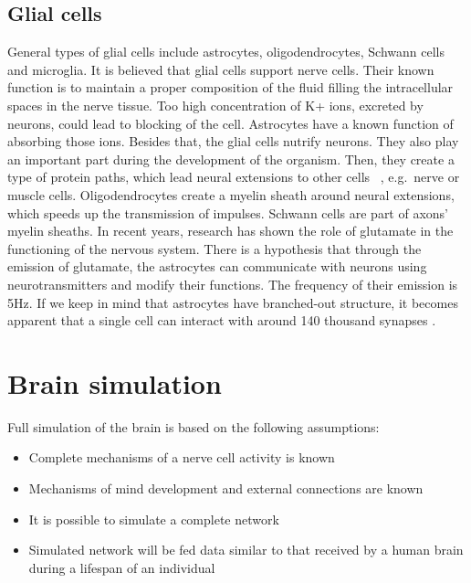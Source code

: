 \documentclass[10pt,oneside]{memoir}
\begin{document}
\section{Glial cells}
\label{glialcells}

General types of glial cells include astrocytes, oligodendrocytes, Schwann cells and microglia. It is believed that glial cells support nerve cells.
Their known function is to maintain a proper composition of the fluid filling the intracellular spaces in the nerve tissue. Too high concentration of K+ ions, excreted by neurons, could lead to blocking of the cell. Astrocytes have a known function of absorbing those ions. Besides that, the glial cells nutrify neurons. They also play an important part during the development of the organism. Then, they create a type of protein paths, which lead neural extensions to other cells ~\cite{Szarski:1976}, e.g.\ nerve or muscle cells. Oligodendrocytes create a myelin sheath around neural extensions, which speeds up the transmission of impulses. Schwann cells are part of axons' myelin sheaths.
In recent years, research has shown the role of glutamate in the functioning of the nervous system. There is a hypothesis that through the emission of glutamate, the astrocytes can communicate with neurons using neurotransmitters and modify their functions. The frequency of their emission is 5Hz. If we keep in mind that astrocytes have branched-out structure, it becomes apparent that a single cell can interact with around 140 thousand synapses \cite{Bezzi:Gundersen:2004}.


\chapter{Brain simulation}
\label{brainsimulation}

Full simulation of the brain is based on the following assumptions:


\begin{itemize}


\item Complete mechanisms of a nerve cell activity is known

\item Mechanisms of mind development and external connections are known

\item It is possible to simulate a complete network

\item Simulated network will be fed data similar to that received by a human brain during a lifespan of an individual
\end{itemize}
\end{document}
